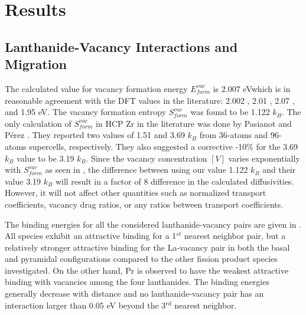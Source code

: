 \documentclass[preprint,12pt]{elsarticle}
\providecommand{\DIFadd}[1]{{\bf #1}} %
\providecommand{\DIFdel}[1]{} %
\providecommand{\DIFaddbegin}{\protect\color{blue}} %
\providecommand{\DIFaddend}{\protect\color{black}} %
\providecommand{\DIFdelbegin}{\protect\color{red}} %
\providecommand{\DIFdelend}{\protect\color{black}} %
\newcommand{\DIFscaledelfig}{0.5}
\newlength{\DIFdelgraphicswidth} %
\newlength{\DIFdelgraphicsheight} %
\newcommand{\DIFaddincludegraphics}[2][]{{\color{blue}\fbox{\DIFOincludegraphics[#1]{#2}}}} %
\newcommand{\DIFdelincludegraphics}[2][]{%
\sbox{\DIFdelgraphicsbox}{\DIFOincludegraphics[#1]{#2}}%
\settoboxwidth{\DIFdelgraphicswidth}{\DIFdelgraphicsbox} %
\settoboxtotalheight{\DIFdelgraphicsheight}{\DIFdelgraphicsbox} %
\scalebox{\DIFscaledelfig}{%
\parbox[b]{\DIFdelgraphicswidth}{\usebox{\DIFdelgraphicsbox}\\[-\baselineskip] \rule{\DIFdelgraphicswidth}{0em}}\llap{\resizebox{\DIFdelgraphicswidth}{\DIFdelgraphicsheight}{%
\setlength{\unitlength}{\DIFdelgraphicswidth}%
\begin{picture}(1,1)%
\thicklines\linethickness{2pt} %
{\color[rgb]{1,0,0}\put(0,0){\framebox(1,1){}}}%
{\color[rgb]{1,0,0}\put(0,0){\line( 1,1){1}}}%
{\color[rgb]{1,0,0}\put(0,1){\line(1,-1){1}}}%
\end{picture}%
}\hspace*{3pt}}} %
} %
\DeclareRobustCommand{\DIFaddbegin}{\DIFOaddbegin \let\includegraphics\DIFaddincludegraphics} %
\DeclareRobustCommand{\DIFaddend}{\DIFOaddend \let\includegraphics\DIFOincludegraphics} %
\DeclareRobustCommand{\DIFdelbegin}{\DIFOdelbegin \let\includegraphics\DIFdelincludegraphics} %
\DeclareRobustCommand{\DIFdelend}{\DIFOaddend \let\includegraphics\DIFOincludegraphics} %
\begin{document}
\FloatBarrier

\section{Results}
\label{results}

\subsection{Lanthanide-Vacancy Interactions and Migration}
\DIFaddbegin \label{lanthanide_vac_inter}
\DIFaddend 

The calculated value for vacancy formation energy $E_{form}^{vac}$ is 2.007 eV\DIFaddbegin \DIFadd{, }\DIFaddend which is in reasonable agreement with the DFT values in the literature: 2.002 \cite{jain_first-principles_2019}, 2.01 \cite{lu_first-principles_2018}, 2.07 \cite{varvenne_vacancy_2014}, and 1.95 \cite{pasianot_issues_2012} eV. The vacancy formation entropy $S_{form}^{vac}$ was found to be 1.122 $k_B$. The only calculation of $S_{form}^{vac}$ in HCP Zr in the literature was done by Pasianot and P\'erez \cite{pasianot_issues_2012}. They reported two values of 1.51 and 3.69 $k_B$ from 36-atoms and 96-atoms supercells, respectively. They also suggested a corrective -10\% for the 3.69 $k_B$ value to be 3.19 $k_B$. Since the vacancy concentration $[V]$ varies exponentially with $S_{form}^{vac}$ as seen in , the difference between using our value 1.122 $k_B$ and their value 3.19 $k_B$ \cite{pasianot_issues_2012} will result in a factor of 8 difference in the calculated diffusivities. However, it will not affect other quantities such as normalized transport coefficients, vacancy drag ratios, or any ratios between transport coefficients. 

The binding energies for all the considered lanthanide-vacancy pairs are given in . All species exhibit an attractive binding for a 1$^{st}$ nearest neighbor pair, but \DIFdelbegin \DIFdel{we observe }\DIFdelend a relatively stronger attractive binding \DIFaddbegin \DIFadd{is observed }\DIFaddend for the La-vacancy pair in both the basal and pyramidal configurations compared to the other fission product species investigated. 
On the other hand, Pr is observed to have the weakest attractive binding with vacancies among the four lanthanides. The binding energies generally decrease with distance and no lanthanide-vacancy pair has an interaction larger than 0.05 eV beyond the 3$^{rd}$ nearest neighbor. 
\end{document}
